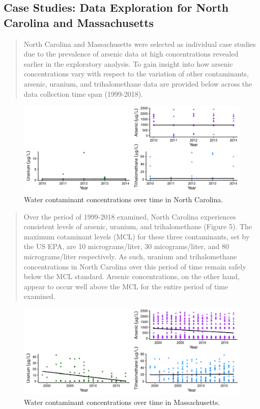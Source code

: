 \documentclass[12pt,]{article}
\begin{document}
\newpage

\hypertarget{case-studies-data-exploration-for-north-carolina-and-massachusetts}{%
\subsection{Case Studies: Data Exploration for North Carolina and
Massachusetts}\label{case-studies-data-exploration-for-north-carolina-and-massachusetts}}

\begin{quote}
North Carolina and Massachusetts were selected as individual case
studies due to the prevalence of arsenic data at high concentrations
revealed earlier in the exploratory analysis. To gain insight into how
arsenic concentrations vary with respect to the variation of other
contaminants, arsenic, uranium, and trihalomethane data are provided
below across the data collection time span (1999-2018).
\end{quote}

\begin{figure}
\centering
\includegraphics{Project_Template_files/figure-latex/figs5-1.pdf}
\caption{Water contaminant concentrations over time in North Carolina.}
\end{figure}

\begin{quote}
Over the period of 1999-2018 examined, North Carolina experiences
consistent levels of arsenic, uranium, and trihalomethane (Figure 5).
The maximum cotaminant levels (MCL) for these three contaminants, set by
the US EPA, are 10 micrograms/liter, 30 micograms/liter, and 80
micrograms/liter respectively. As such, uranium and trihalomethane
concentrations in North Carolina over this period of time remain safely
below the MCL standard. Arsenic concentrations, on the other hand,
appear to occur well above the MCL for the entire period of time
examined.
\end{quote}

\begin{figure}
\centering
\includegraphics{Project_Template_files/figure-latex/figs6-1.pdf}
\caption{Water contaminant concentrations over time in Massachusetts.}
\end{figure}
\end{document}

